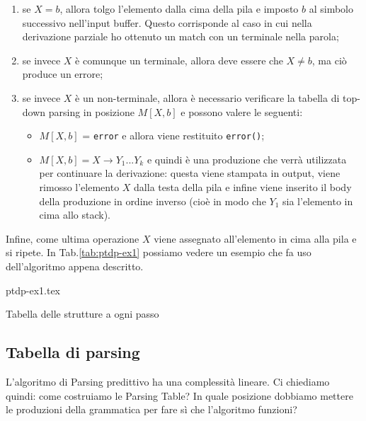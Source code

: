 \documentclass[class=book, crop=false, oneside, 12pt]{standalone}
\begin{document}
\begin{enumerate}
    \item se \(X = b\), allora tolgo l'elemento dalla cima della pila e imposto \(b\) al simbolo successivo nell'input buffer. Questo corrisponde al caso in cui nella derivazione parziale ho ottenuto un match con un terminale nella parola;
    \item se invece \(X\) è comunque un terminale, allora deve essere che \(X \neq b\), ma ciò produce un errore;
    \item se invece \(X\) è un non-terminale, allora è necessario verificare la tabella di top-down parsing in posizione \(M[X, b]\) e possono valere le seguenti:
    \begin{itemize}
        \item \(M[X, b]\) = \texttt{error} e allora viene restituito \texttt{error()};
        \item \(M[X, b] = X \rightarrow Y_1...Y_k\) e quindi è una produzione che verrà utilizzata per continuare la derivazione: questa viene stampata in output, viene rimosso l'elemento \(X\) dalla testa della pila e infine viene inserito il body della produzione in ordine inverso (cioè in modo che \(Y_1\) sia l'elemento in cima allo stack).
    \end{itemize}
\end{enumerate}

Infine, come ultima operazione \(X\) viene assegnato all'elemento in cima alla pila e si ripete. In Tab.\ref{tab:ptdp-ex1} possiamo vedere un esempio che fa uso dell'algoritmo appena descritto.
\begin{table}[H]
	\centering
	{ptdp-ex1.tex}
    \caption{Tabella delle strutture a ogni passo}
    \label{tab:ptdp-ex1}
\end{table} 

\subsection{Tabella di parsing}

L'algoritmo di Parsing predittivo ha una complessità lineare. Ci chiediamo quindi: come costruiamo le Parsing Table? In quale posizione dobbiamo mettere le produzioni della grammatica per fare sì che l'algoritmo funzioni?
\end{document}
